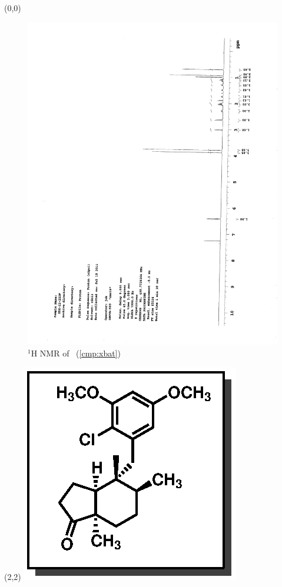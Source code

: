 \begin{textblock}{20}(0,0)
\begin{figure}[htb]
\caption{$^1$H NMR of \CMPxbat\ (\ref{cmp:xbat})}
\includegraphics[scale=0.75, trim = 0mm 0mm 0mm 5mm,
clip]{chp_singlecarbon/images/nmr/xbatH}
\vspace{-100pt}
\end{figure}
\end{textblock}
\begin{textblock}{1}(2,2)
\includegraphics[scale=0.8, angle=90]{chp_singlecarbon/images/xbat}
\end{textblock}

